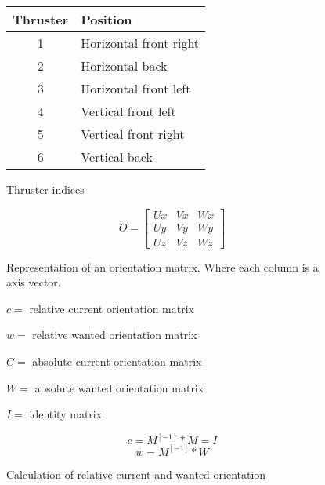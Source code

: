\begin{figure}
	\begin{center}
		\begin{tabular}{c l}
			Thruster & Position \\
			\hline		
			1 & Horizontal front right \\
			2 & Horizontal back \\
			3 & Horizontal front left  \\
			4 & Vertical front left \\
			5 & Vertical front right \\
			6 & Vertical back
		\end{tabular}
	\caption{Thruster indices}
	\label{fig:THRUSTERINDICES}
	 \end{center}
 \end{figure}

\begin{figure}
	\begin{center}
		\[ O = 
		\begin{bmatrix}
			Ux & Vx & Wx \\
			Uy & Vy & Wy \\
			Uz & Vz & Wz 
		\end{bmatrix} \]
		\caption{Representation of an orientation matrix. Where each column is a axis vector.}
		\label{fig:ORIENTATIONMATRIX}
	\end{center}
\end{figure}

\begin{figure}
	\begin{center}
			$c =$ relative current orientation matrix

			$w =$ relative wanted orientation matrix 

			$C =$ absolute current orientation matrix 

			$W =$ absolute wanted orientation matrix 

			$I =$ identity matrix 

		\begin{equation}
			c = M^[-1] * M = I
		\end{equation}
		\begin{equation}
			w = M^[-1] * W
		\end{equation}

		\caption{Calculation of relative current and wanted orientation}
		\label{fig:RELATIVEROTATIONCALCULATION}
	\end{center}
\end{figure}

		 